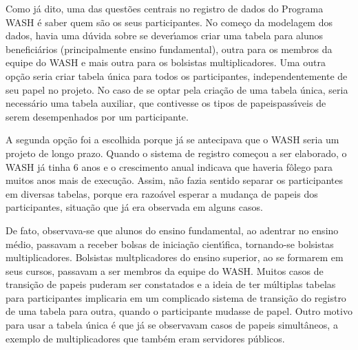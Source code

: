 \documentclass[
12pt,		%
openright,	%
twoside,  %
a4paper,			%
chapter=TITLE,		%
english,			%
french,				%
spanish,			%
brazil				%
]{USPSC-classe/USPSC}
\begin{document}
Como j\'a dito, uma das quest\~oes centrais no registro de dados do Programa WASH \'e saber quem s\~ao os seus participantes. No come\c{c}o da modelagem dos dados, havia uma d\'uvida sobre se dever\'{\i}amos criar uma tabela para alunos benefici\'arios (principalmente ensino fundamental), outra para os membros da equipe do WASH e mais outra para os bolsistas multiplicadores. Uma outra op\c{c}\~ao seria criar tabela \'unica para todos os participantes, independentemente de seu papel no projeto. No caso de se optar pela cria\c{c}\~ao de uma tabela \'unica, seria necess\'ario uma tabela auxiliar, que contivesse os \textquotedbl tipos de papeis\textquotedbl  pass\'{\i}veis de serem desempenhados por um participante.

















A segunda op\c{c}\~ao foi a escolhida porque j\'a se antecipava que o WASH seria um projeto de longo prazo. Quando o sistema de registro come\c{c}ou a ser elaborado, o WASH j\'a tinha 6 anos e o crescimento anual indicava que haveria f\^olego para muitos anos mais de execu\c{c}\~ao. Assim, n\~ao fazia sentido separar os participantes em diversas tabelas, porque era razo\'avel esperar a mudan\c{c}a de papeis dos participantes, situa\c{c}\~ao que j\'a era observada em alguns casos.

















De fato, observava-se que alunos do ensino fundamental, ao adentrar no ensino m\'edio, passavam a receber bolsas de inicia\c{c}\~ao cient\'{\i}fica, tornando-se bolsistas multiplicadores. Bolsistas multplicadores do ensino superior, ao se formarem em seus cursos, passavam a ser membros da equipe do WASH. Muitos casos de transi\c{c}\~ao de papeis puderam ser constatados e a ideia de ter m\'ultiplas tabelas para participantes implicaria em um complicado sistema de transi\c{c}\~ao do registro de uma tabela para outra, quando o participante mudasse de papel. Outro motivo para usar a tabela \'unica \'e que j\'a se observavam casos de papeis simult\^aneos, a exemplo de multiplicadores que tamb\'em eram servidores p\'ublicos.
\end{document}
